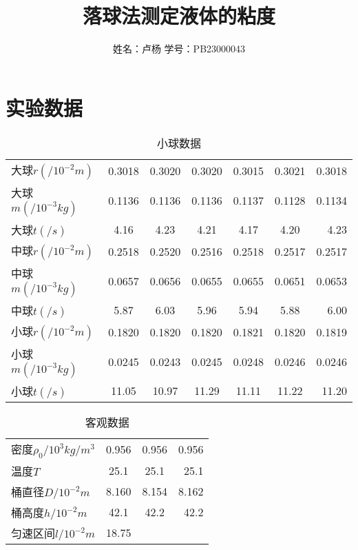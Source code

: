 \documentclass{article}
\title{落球法测定液体的粘度}
\author{姓名：卢杨 \quad 学号：PB23000043}
\begin{document}
\maketitle
\section{实验数据}

\begin{table}[!hbtp]
    \begin{center}
    \caption{小球数据}
    \begin{tabular}{l|c|c|c|c|c|r}
        \hline
        大球$r(/10^{-2}m)$ & 0.3018 & 0.3020 & 0.3020 & 0.3015 & 0.3021 & 0.3018 \\
        大球$m(/10^{-3}kg)$ & 0.1136 & 0.1136 & 0.1136 & 0.1137 & 0.1128 & 0.1134 \\
        大球$t(/s)$ & 4.16 & 4.23 & 4.21 & 4.17 & 4.20 & 4.23 \\
        中球$r(/10^{-2}m)$ & 0.2518 & 0.2520 & 0.2516 & 0.2518 & 0.2517 & 0.2517 \\
        中球$m(/10^{-3}kg)$ & 0.0657 & 0.0656 & 0.0655 & 0.0655 & 0.0651 & 0.0653 \\
        中球$t(/s)$ & 5.87 & 6.03 & 5.96 & 5.94 & 5.88 & 6.00 \\
        小球$r(/10^{-2}m)$ & 0.1820 & 0.1820 & 0.1820 & 0.1821 & 0.1820 & 0.1819 \\
        小球$m(/10^{-3}kg)$ & 0.0245 & 0.0243 & 0.0245 & 0.0248 & 0.0246 & 0.0246 \\
        小球$t(/s)$ & 11.05 & 10.97 & 11.29 & 11.11 & 11.22 & 11.20 \\
    \end{tabular}
    \end{center}
\end{table}


\begin{table}[!hbtp]
    \begin{center}
    \caption{客观数据}
    \begin{tabular}{l|c|c|r}
        \hline
        密度$\rho _0/10^{3}kg/m^3$ &0.956 & 0.956 & 0.956 \\
        温度$T$ & 25.1 & 25.1 & 25.1 \\
        桶直径$D/10^{-2}m$ & 8.160 & 8.154 & 8.162 \\
        桶高度$h/10^{-2}m$ & 42.1 & 42.2 & 42.2 \\
        匀速区间$l/10^{-2}m$ & 18.75 \\
    \end{tabular}
    \end{center}
\end{table}
\end{document}
